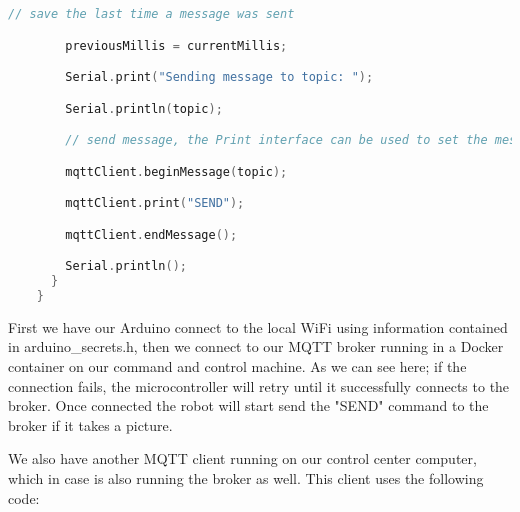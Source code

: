 \documentclass[12pt,a4paper]{article}
\begin{document}
\begin{lstlisting}[language=C, caption=Arduino Client]
        // save the last time a message was sent

        previousMillis = currentMillis;

        Serial.print("Sending message to topic: ");

        Serial.println(topic);

        // send message, the Print interface can be used to set the message contents

        mqttClient.beginMessage(topic);

        mqttClient.print("SEND");

        mqttClient.endMessage();

        Serial.println();
      }
    }

\end{lstlisting}

First we have our Arduino connect to the local WiFi using information contained in arduino_secrets.h, then we connect to our MQTT broker running in a Docker container on our command and control machine.
As we can see here; if the connection fails, the microcontroller will retry until it successfully connects to the broker. Once connected the robot will start send the "SEND" command to the broker if it takes a picture.

We also have another MQTT client running on our control center computer, which in case is also running the broker as well.
This client uses the following code:
\end{document}
